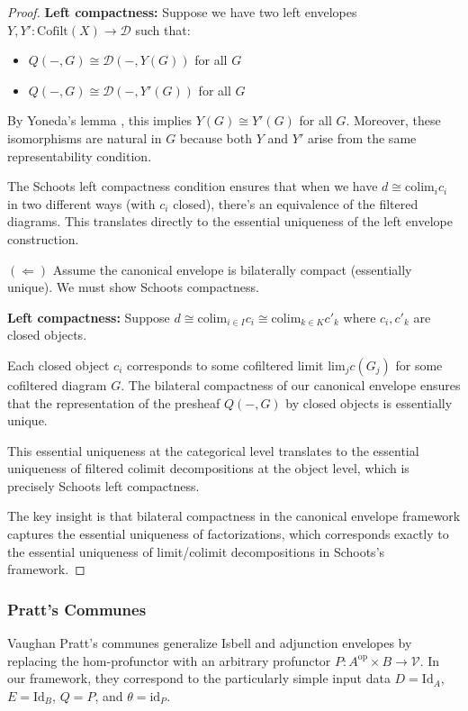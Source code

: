 \documentclass[11pt]{article}
\theoremstyle{plain}
\theoremstyle{definition}
\theoremstyle{remark}
\newcommand{\V}{\mathcal{V}}
\newcommand{\op}{\mathrm{op}}
\newcommand{\colim}{\mathrm{colim}}
\renewcommand{\lim}{\mathrm{lim}}
\begin{document}
\begin{proof}
\textbf{Left compactness:} Suppose we have two left envelopes $Y, Y' : \mathrm{Cofilt}(X) \to \mathcal{D}$ such that:
\begin{itemize}
\item $Q(-, G) \cong \mathcal{D}(-, Y(G))$ for all $G$
\item $Q(-, G) \cong \mathcal{D}(-, Y'(G))$ for all $G$  
\end{itemize}

By Yoneda's lemma \cite{yoneda1954homology}, this implies $Y(G) \cong Y'(G)$ for all $G$. Moreover, these isomorphisms are natural in $G$ because both $Y$ and $Y'$ arise from the same representability condition.

The Schoots left compactness condition ensures that when we have $d \cong \colim_i c_i$ in two different ways (with $c_i$ closed), there's an equivalence of the filtered diagrams. This translates directly to the essential uniqueness of the left envelope construction.

$(\Leftarrow)$ Assume the canonical envelope is bilaterally compact (essentially unique). We must show Schoots compactness.

\textbf{Left compactness:} Suppose $d \cong \colim_{i \in I} c_i \cong \colim_{k \in K} c'_k$ where $c_i, c'_k$ are closed objects.

Each closed object $c_i$ corresponds to some cofiltered limit $\lim_j c(G_j)$ for some cofiltered diagram $G$. The bilateral compactness of our canonical envelope ensures that the representation of the presheaf $Q(-, G)$ by closed objects is essentially unique.

This essential uniqueness at the categorical level translates to the essential uniqueness of filtered colimit decompositions at the object level, which is precisely Schoots left compactness.

The key insight is that bilateral compactness in the canonical envelope framework captures the essential uniqueness of factorizations, which corresponds exactly to the essential uniqueness of limit/colimit decompositions in Schoots's framework.
\end{proof}

\subsubsection{Pratt's Communes}

Vaughan Pratt's communes \cite{pratt2010communes,pratt2010chu} generalize Isbell and adjunction envelopes by replacing the hom-profunctor with an arbitrary profunctor $P : A^{\op} \times B \to \V$. In our framework, they correspond to the particularly simple input data $D = \mathrm{Id}_A$, $E = \mathrm{Id}_B$, $Q = P$, and $\theta = \mathrm{id}_P$.
\end{document}
